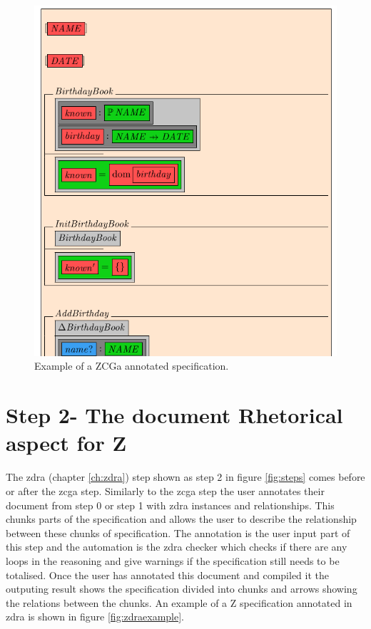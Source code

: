\begin{figure}[H]
 \begin{center}
 \includegraphics [scale=0.2]{Figures/Design/zcgaexample.png}
 \caption{Example of a ZCGa annotated specification.}
 \label{fig:zcgaexample}
\end{center}
\end{figure} 

\section{Step 2- The document Rhetorical aspect for Z}

The \gls{zdra} (chapter \ref{ch:zdra}) step shown as step 2 in figure \ref{fig:steps} comes before or after the \gls{zcga} step. Similarly to the \gls{zcga} step the user annotates their document from step 0 or step 1 with \gls{zdra} instances and relationships. This chunks parts of the specification and allows the user to describe the relationship between these chunks of specification. The annotation is the user input part of this step and the automation is the \gls{zdra} checker which checks if there are any loops in the reasoning and give warnings if the specification still needs to be totalised. Once the user has annotated this document and compiled it the outputing result shows the specification divided into chunks and arrows showing the relations between the chunks. An example of a Z specification annotated in \gls{zdra} is shown in figure \ref{fig:zdraexample}.

